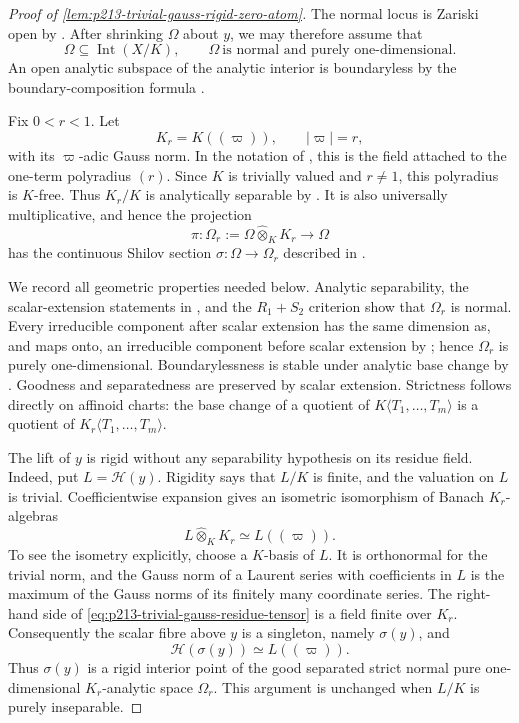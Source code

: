 \begin{proof}[Proof of
\cref{lem:p213-trivial-gauss-rigid-zero-atom}]
The normal locus is Zariski open by \cite[\S11.3.1]{CLD25}.  After
shrinking $\Omega$ about $y$, we may therefore assume that
\[
 \Omega\subseteq\operatorname{Int}(X/K),
 \qquad
 \Omega\ \text{is normal and purely one-dimensional}.
\]
An open analytic subspace of the analytic interior is boundaryless by
the boundary-composition formula \cite[(11.4.1.3)]{CLD25}.

Fix $0<r<1$.  Let
\[
 K_r=K((\varpi)),\qquad |\varpi|=r,
\]
with its $\varpi$-adic Gauss norm.  In the notation of
\cite[Example~11.1.3]{CLD25}, this is the field attached to the one-term
polyradius $(r)$.  Since $K$ is trivially valued and $r\ne1$, this
polyradius is $K$-free.  Thus $K_r/K$ is analytically separable by
\cite[\S11.1.9]{CLD25}.  It is also universally multiplicative, and hence
the projection
\[
 \pi:\Omega_r:=\Omega\widehat\otimes_K K_r\longrightarrow\Omega
\]
has the continuous Shilov section
$\sigma:\Omega\to\Omega_r$ described in
\cite[\S12.7.4--Corollary~12.7.5]{CLD25}.

We record all geometric properties needed below.  Analytic separability,
the scalar-extension statements in \cite[\S\S11.1.9 and 11.3.1]{CLD25},
and the $R_1+S_2$ criterion show that $\Omega_r$ is normal.  Every
irreducible component after scalar extension has the same dimension as,
and maps onto, an irreducible component before scalar extension by
\cite[\S11.2.5]{CLD25}; hence $\Omega_r$ is purely one-dimensional.
Boundarylessness is stable under analytic base change by
\cite[\S11.4.1]{CLD25}.  Goodness and separatedness are preserved by
scalar extension.  Strictness follows directly on affinoid charts: the
base change of a quotient of
$K\langle T_1,\ldots,T_m\rangle$ is a quotient of
$K_r\langle T_1,\ldots,T_m\rangle$.

The lift of $y$ is rigid without any separability hypothesis on its
residue field.  Indeed, put $L=\mathscr H(y)$.  Rigidity says that $L/K$
is finite, and the valuation on $L$ is trivial.  Coefficientwise
expansion gives an isometric isomorphism of Banach $K_r$-algebras
\begin{equation}
\label{eq:p213-trivial-gauss-residue-tensor}
             L\widehat\otimes_K K_r\simeq L((\varpi)).
\end{equation}
To see the isometry explicitly, choose a $K$-basis of $L$.  It is
orthonormal for the trivial norm, and the Gauss norm of a Laurent series
with coefficients in $L$ is the maximum of the Gauss norms of its finitely
many coordinate series.  The right-hand side of
\eqref{eq:p213-trivial-gauss-residue-tensor} is a field finite over $K_r$.
Consequently the scalar fibre above $y$ is a singleton, namely
$\sigma(y)$, and
\[
             \mathscr H(\sigma(y))\simeq L((\varpi)).
\]
Thus $\sigma(y)$ is a rigid interior point of the good separated strict
normal pure one-dimensional $K_r$-analytic space $\Omega_r$.  This
argument is unchanged when $L/K$ is purely inseparable.


\end{proof}

